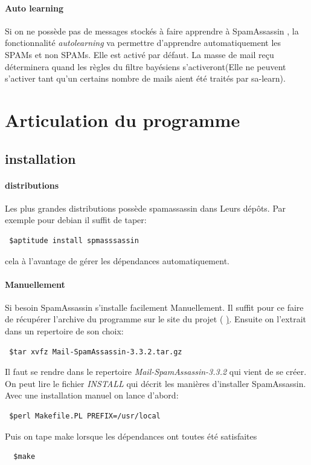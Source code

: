 \documentclass[a4paper,11pt]{article}
\begin{document}
\paragraph*{Auto learning}
Si on ne possède pas de messages stockés à faire apprendre à SpamAssassin , la fonctionnalité \emph{autolearning}
va permettre d'apprendre automatiquement les SPAMs et non SPAMs. Elle est activé par défaut. La masse de mail 
reçu déterminera quand les règles du filtre bayésiens s'activeront(Elle ne peuvent s'activer tant qu'un certains nombre de mails aient été traités par sa-learn).



\section{Articulation du programme}
\subsection{installation}
\paragraph{distributions}
Les plus grandes distributions possède spamassassin dans Leurs dépôts. Par exemple pour debian il suffit de taper:
\begin{lstlisting}
 $aptitude install spmasssassin 
\end{lstlisting}
cela à l'avantage de gérer les dépendances automatiquement.

\paragraph{Manuellement}
Si besoin SpamAssassin s'installe facilement Manuellement. Il suffit pour ce faire de récupérer l'archive du programme sur le site du projet ( \href{http://spamassassin.apache.org/}).
Ensuite on l'extrait dans un repertoire de son choix:
\begin{lstlisting}
 $tar xvfz Mail-SpamAssassin-3.3.2.tar.gz
\end{lstlisting}
Il faut se rendre dans le repertoire \emph{ Mail-SpamAssassin-3.3.2} qui vient de se créer. On peut lire le fichier \emph{INSTALL}
qui décrit les manières d'installer SpamAssassin. Avec une installation manuel on lance d'abord:
\begin{lstlisting}
 $perl Makefile.PL PREFIX=/usr/local
\end{lstlisting}
 Puis on tape make lorsque les dépendances ont toutes été satisfaites
\begin{lstlisting}
  $make            
\end{lstlisting}
\end{document}
